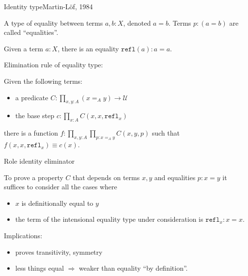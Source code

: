 \documentclass[english]{beamer}
\begin{document}
\begin{frame}{Identity type}{Martin-L\"of, 1984}

    A type of equality between terms $a,b : X$, denoted $a = b$. Terms $p : (a =b)$ are called ``equalities''.

    \begin{definition}
        Given a term $a : X$, there is an equality $\texttt{refl}(a): a = a$.
    \end{definition}

       Elimination rule of equality type:

    \begin{definition}
            Given the following terms:
        \begin{itemize}
            \item a predicate \(C : \prod_{x,y:A} (x =_A y) \rightarrow \mathcal{U}\)
            \item the base step \(c:\prod_{x:A} C(x,x,\texttt{refl}_x)\)
        \end{itemize}
            there is a function \(f: \prod_{x,y:A} \prod_{p:x=_Ay}C(x,y,p)\) such that \(f(x,x,\texttt{refl}_x) \equiv c(x)\).
        
    \end{definition}

    
\end{frame}

\begin{frame}{Role identity eliminator}

    To prove a property \(C\) that depends on terms $x,y$ and equalities $p:x=y$  it suffices to consider all the cases where
        \begin{itemize}
            \item $x$ is definitionally equal to $y$
            \item the term of the intensional equality type under consideration is $\texttt{refl}_x : x = x$.
        \end{itemize}

        Implications:
        \begin{itemize}
            \item proves transitivity, symmetry
            \item less things equal $\Rightarrow$ weaker than equality ``by definition''.
        \end{itemize}
        
\end{frame}
\end{document}
